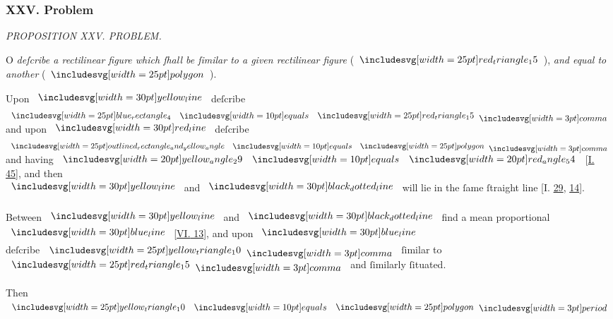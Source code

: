 \documentclass[11pt,preview]{standalone}
\begin{document}
\subsubsection{XXV. Problem}

\begin{minipage}[t]{0.54\textwidth}
    \begin{center}
        \textit{PROPOSITION XXV. PROBLEM.}\label{book6pr25} \\
    \end{center}

    \hfill

    \begin{center}
        \raggedright \lettrine[lines=3, loversize=1, nindent=0pt]{}{}O \textit{deſcribe a rectilinear figure which ſhall be ſimilar to a given rectilinear figure} (\hspace{-1ex}$\img{red_triangle_15}$\hspace{-1ex}), \textit{and equal to another} (\hspace{-1ex}$\img{polygon}$\hspace{-1ex}).
    \end{center}
\end{minipage}%
\hfill
\begin{minipage}[t]{0.43\textwidth}
    \vspace{20pt}
    
\end{minipage}

\hfill

\hfill

\begin{center}
    Upon $\yellowline$ deſcribe $\img{blue_rectangle_4} \bequals \img{red_triangle_15} \bcomma$\\
    and upon $\redline$ deſcribe $\img{outlined_rectangle_and_yellow_angle} \bequals \img{polygon} \bcomma$\\
    and having $\img[0][0][20]{yellow_angle_29} \bequals \img[0][0][20]{red_angle_54}$  [\hyperref[book1pr45]{\textsc{I.} 45}], and then\\
    $\yellowline$ and $\dottedblackline$ will lie in the ſame ſtraight line [\textsc{I.} \hyperref[book1pr29]{29}, \hyperref[book1pr14]{14}].\\
    \hfill\\
    Between $\yellowline$ and $\dottedblackline$ find a mean proportional\\
    $\blueline$ [\hyperref[book6pr13]{\textsc{VI.} 13}], and upon $\blueline$\\
    deſcribe $\img{yellow_triangle_10} \bcomma$ ſimilar to $\img{red_triangle_15} \bcomma$ and ſimilarly ſituated.\\
    \hfill\\
    Then $\img{yellow_triangle_10} \bequals \img{polygon} \bperiod$
\end{center}
\end{document}

